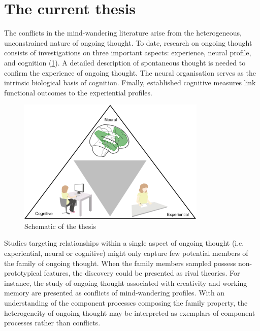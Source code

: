 \section{The current thesis}

The conflicts in the mind-wandering literature arise from the heterogeneous, unconstrained nature of ongoing thought. To date, research on ongoing thought consists of investigations on three important aspects: experience, neural profile, and cognition (\cref{fig:intro:fig1}). A detailed description of spontaneous thought is needed to confirm the experience of ongoing thought. The neural organisation serves as the intrinsic biological basis of cognition. Finally, established cognitive measures link functional outcomes to the experiential profiles. 

\begin{figure}[H]
    \vspace{10pt}
    \centering
    \includegraphics[width=0.8\textwidth]{intro/image/thesisfig1.png}
    \caption{Schematic of the thesis}
    \label{fig:intro:fig1}
\end{figure}

Studies targeting relationships within a single aspect of ongoing thought (i.e. experiential, neural or cognitive) might only capture few potential members of the family of ongoing thought. When the family members sampled possess non-prototypical features, the discovery could be presented as rival theories. For instance, the study of ongoing thought associated with creativity and working memory are presented as conflicts of mind-wandering profiles. With an understanding of the component processes composing the family property, the heterogeneity of ongoing thought may be interpreted as exemplars of component processes rather than conflicts. 

